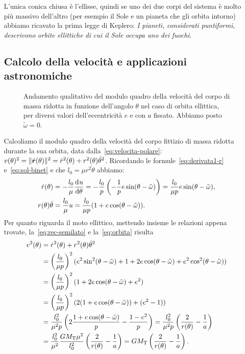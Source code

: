 L'unica conica chiusa è l'ellisse, quindi se uno dei due corpi del sistema è
molto più massivo dell'altro (per esempio il Sole e un pianeta che gli orbita
intorno) abbiamo ricavato la prima legge di Keplero: \emph{I pianeti,
  considerati puntiformi, descrivono orbite ellittiche di cui il Sole occupa uno
  dei fuochi}.

\subsection{Calcolo della velocità e applicazioni astronomiche}
\label{sec:velocita}
\begin{figure}
  \centering
  
  \caption{Andamento qualitativo del modulo quadro della velocità del corpo di
    massa ridotta in funzione dell'angolo $\theta$ nel caso di orbita ellittica,
    per diversi valori dell'eccentricità $e$ e con $a$ fissato. Abbiamo posto
    $\tilde\omega=0$.}
  \label{fig:velocita}
\end{figure}
Calcoliamo il modulo quadro della velocità del corpo fittizio di massa ridotta
durante la sua orbita, data dalla~\eqref{eq:velocita-polare}: $v(\theta)^2 =
\lVert\dot{\bm{r}}(\theta)\rVert^2 = \dot{r}^2(\theta) +
r^2(\theta)\dot{\theta}^2$. Ricordando le formule~\eqref{eq:derivata1-r}
e~\eqref{eq:sol-binet} e che $l_0=\mu r^2\dot{\theta}$ abbiamo:
\begin{subequations}
  \begin{align}
    \dot{r}(\theta) &= -\frac{l_0}{\mu}\frac{{\mathop{}\!\mathrm{d}^{}}u}{\mathop{}\!\mathrm{d} {\theta}^{}} = -\frac{l_0}{p}
    \left(
      -\frac{1}{p}e\sin(\theta-\tilde\omega)
    \right) = \frac{l_0}{\mu p}e\sin(\theta-\tilde\omega), \\
    r(\theta)\dot{\theta} &= \frac{l_0}{\mu}u = \frac{l_0}{\mu
      p}(1+e\cos(\theta-\tilde\omega)).
  \end{align}
\end{subequations}
Per quanto riguarda il moto ellittico, mettendo insieme le relazioni appena
trovate, la~\eqref{eq:rec-semilato} e la~\eqref{eq:orbita} risulta
\begin{equation}
  \label{eq:velocita-ellisse}
  \begin{split}
    v^2(\theta) &= \dot{r}^2(\theta) + r^2(\theta)\dot{\theta}^2 \\
    &= \left(
      \frac{l_0}{\mu p}
    \right)^2(e^2\sin^2(\theta-\tilde\omega) + 1 + 2e\cos(\theta-\tilde\omega) +
    e^2\cos^2(\theta-\tilde\omega)) \\
    &= \left(
      \frac{l_0}{\mu p}
    \right)^2(1+2e\cos(\theta-\tilde\omega)+e^2) \\
    &= \left(
      \frac{l_0}{\mu p}
    \right)^2(2(1+e\cos(\theta-\tilde\omega)) + (e^2-1)) \\
    &= \frac{l_0^2}{\mu^2p}
    \left(
      2\frac{1+e\cos(\theta-\tilde\omega)}{p} - \frac{1-e^2}{p}
    \right) = \frac{l_0^2}{\mu^2 p}
    \left(
      \frac{2}{r(\theta)} - \frac{1}{a}
    \right) \\
    &= \frac{l_0^2}{\mu^2}\frac{GM_\textup{T}\mu^2}{l_0^2}
    \left(
      \frac{2}{r(\theta)} - \frac{1}{a}
    \right) = GM_\textup{T}
    \left(
      \frac{2}{r(\theta)} - \frac{1}{a}
    \right).
  \end{split}
\end{equation}
